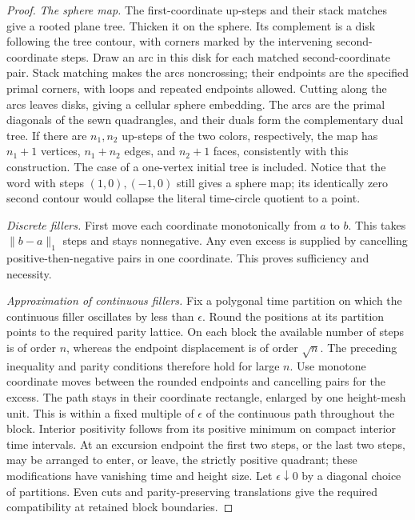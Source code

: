 \begin{proof}
\emph{The sphere map.} The first-coordinate up-steps and their stack
matches give a rooted plane tree. Thicken it on the sphere. Its
complement is a disk following the tree contour, with corners marked
by the intervening second-coordinate steps. Draw an arc in this disk
for each matched second-coordinate pair. Stack matching makes the
arcs noncrossing; their endpoints are the specified primal corners,
with loops and repeated endpoints allowed. Cutting along the arcs
leaves disks, giving a cellular sphere embedding. The arcs are the
primal diagonals of the sewn quadrangles, and their duals form the
complementary dual tree. If there are $n_1,n_2$ up-steps of the two colors, respectively, the map
has $n_1+1$ vertices, $n_1+n_2$ edges, and $n_2+1$ faces, consistently
with this construction. The case of a one-vertex initial tree is
included. Notice that the word with steps $(1,0),(-1,0)$ still gives
a sphere map; its identically zero second contour would collapse
the literal time-circle quotient to a point.

\emph{Discrete fillers.} First move each coordinate monotonically from $a$
to $b$. This takes $\lVert b-a\rVert_1$ steps and stays nonnegative.
Any even excess is supplied by cancelling positive-then-negative
pairs in one coordinate. This proves sufficiency and necessity.

\emph{Approximation of continuous fillers.} Fix a polygonal time
partition on which the continuous filler oscillates by less than
$\epsilon$. Round the positions at its partition points to the
required parity lattice.
On each block the available number of steps is of order $n$, whereas
the endpoint displacement is of order $\sqrt n$. The preceding
inequality and parity conditions therefore hold for large $n$.
Use monotone coordinate moves between the rounded endpoints and
cancelling pairs for the excess. The path stays in their coordinate
rectangle, enlarged by one height-mesh unit. This is within a fixed
multiple of $\epsilon$ of the continuous path throughout the block.
Interior positivity follows from its positive minimum on compact
interior time intervals. At an excursion endpoint the first two
steps, or the last two steps, may be arranged to enter, or leave,
the strictly positive quadrant; these modifications have vanishing
time and height size. Let $\epsilon\downarrow0$ by a diagonal
choice of partitions. Even cuts and parity-preserving translations
give the required compatibility at retained block boundaries.
\end{proof}

